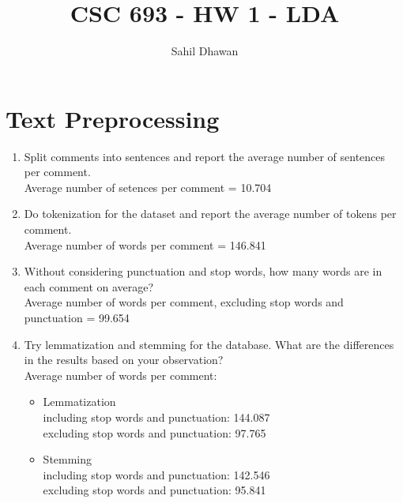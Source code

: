 \documentclass[conference]{IEEEtran}
\begin{document}
\onecolumn
\title{CSC 693 - HW 1 - LDA}
\author{Sahil Dhawan}
\maketitle
\section{Text Preprocessing}
\begin{enumerate}
    \item Split comments into sentences and report the average number of sentences per comment.\\
    \hspace{1cm}Average number of setences per comment = 10.704\\
    \item Do tokenization for the dataset and report the average number of tokens per comment.\\
    \hspace{1cm}Average number of words per comment = 146.841\\
    \item Without considering punctuation and stop words, how many words are in each comment on average?\\
    \hspace{1cm}Average number of words per comment, excluding stop words and punctuation = 99.654\\
    \item Try lemmatization and stemming for the database. What are the differences in the results based on your observation?\\
    \hspace{1cm}Average number of words per comment:
    \begin{itemize}
        \item Lemmatization\\
        \hspace{1cm}including stop words and punctuation: 144.087\\
        \hspace{1cm}excluding stop words and punctuation: 97.765
        \item Stemming\\
        \hspace{1cm}including stop words and punctuation: 142.546\\
        \hspace{1cm}excluding stop words and punctuation: 95.841
    \end{itemize}

\end{enumerate}
\end{document}
